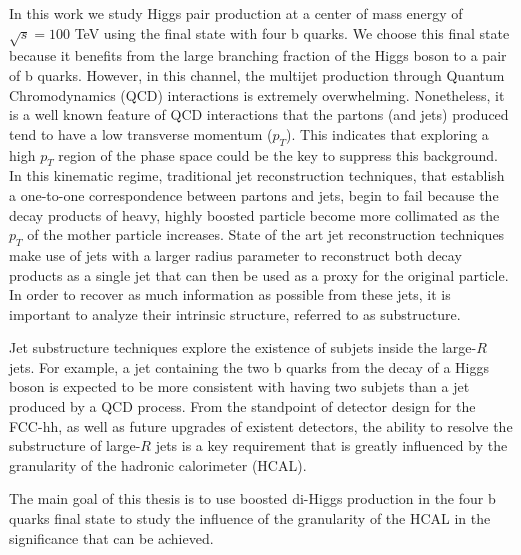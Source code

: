 In this work we study Higgs pair production at a center of mass energy of $\sqrt{s}=100$ TeV using the final state with four b quarks. We choose this final state because it benefits from the large branching fraction of the Higgs boson to a pair of b quarks. However, in this channel, the multijet production through Quantum Chromodynamics (QCD) interactions is extremely overwhelming. Nonetheless, it is a well known feature of QCD interactions that the partons (and jets) produced tend to have a low transverse momentum ($p_T$). This indicates that exploring a high $p_T$ region of the phase space could be the key to suppress this background. In this kinematic regime, traditional jet reconstruction techniques, that establish a one-to-one correspondence between partons and jets, begin to fail because the decay products of heavy, highly boosted particle become more collimated as the $p_T$ of the mother particle increases. State of the art jet reconstruction techniques make use of jets with a larger radius parameter to reconstruct both decay products as a single jet that can then be used as a proxy for the original particle. In order to recover as much information as possible from these jets, it is important to analyze their intrinsic structure, referred to as substructure. 

Jet substructure techniques explore the existence of subjets inside the large-$R$ jets. For example, a jet containing the two b quarks from the decay of a Higgs boson is expected to be more consistent with having two subjets than a jet produced by a QCD process. From the standpoint of detector design for the FCC-hh, as well as future upgrades of existent detectors, the ability to resolve the substructure of large-$R$ jets is a key requirement that is greatly influenced by the granularity of the hadronic calorimeter (HCAL).

The main goal of this thesis is to use boosted di-Higgs production in the four b quarks final state to study the influence of the granularity of the HCAL in the significance that can be achieved.



